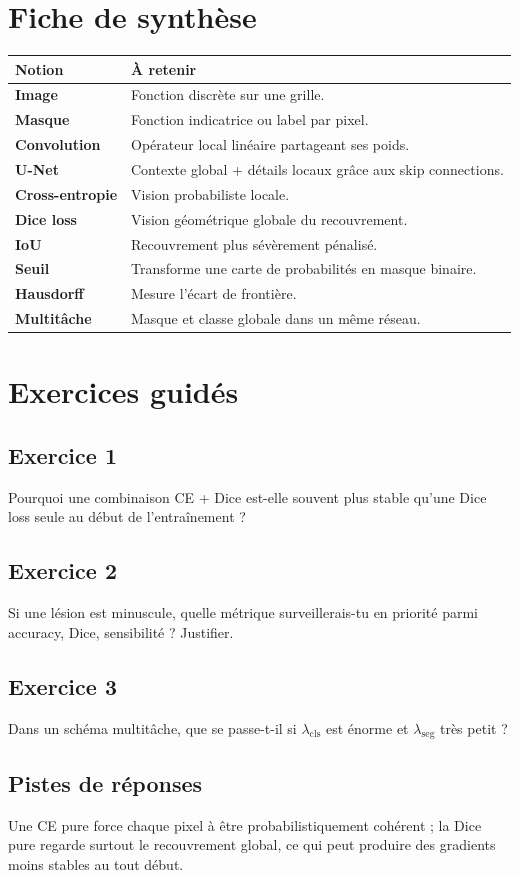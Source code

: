 \documentclass[11pt]{article}
\begin{document}
\section{Fiche de synthèse}
\begin{center}
\begin{tabularx}{0.98\textwidth}{>{\bfseries}lX}
\toprule
Notion & À retenir \\
\midrule
Image & Fonction discrète sur une grille. \\
Masque & Fonction indicatrice ou label par pixel. \\
Convolution & Opérateur local linéaire partageant ses poids. \\
U-Net & Contexte global + détails locaux grâce aux skip connections. \\
Cross-entropie & Vision probabiliste locale. \\
Dice loss & Vision géométrique globale du recouvrement. \\
IoU & Recouvrement plus sévèrement pénalisé. \\
Seuil & Transforme une carte de probabilités en masque binaire. \\
Hausdorff & Mesure l'écart de frontière. \\
Multitâche & Masque et classe globale dans un même réseau. \\
\bottomrule
\end{tabularx}
\end{center}

\section{Exercices guidés}
\subsection*{Exercice 1}
Pourquoi une combinaison CE + Dice est-elle souvent plus stable qu'une Dice loss seule au début de l'entraînement ?

\subsection*{Exercice 2}
Si une lésion est minuscule, quelle métrique surveillerais-tu en priorité parmi accuracy, Dice, sensibilité ? Justifier.

\subsection*{Exercice 3}
Dans un schéma multitâche, que se passe-t-il si $\lambda_{\mathrm{cls}}$ est énorme et $\lambda_{\mathrm{seg}}$ très petit ?

\subsection*{Pistes de réponses}
Une CE pure force chaque pixel à être probabilistiquement cohérent ; la Dice pure regarde surtout le recouvrement global, ce qui peut produire des gradients moins stables au tout début.
\end{document}
